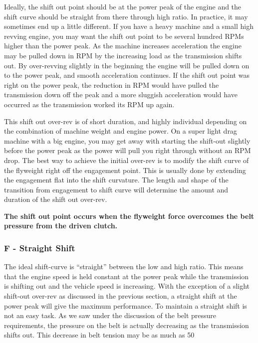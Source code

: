 \documentclass[12pt, titlepage]{article}
\begin{document}
Ideally, the shift out point should be at the power peak of the engine and the shift curve should be straight from there through high ratio. In practice, it may sometimes end up a little different. If you have a heavy machine and a small high revving engine, you may want the shift out point to be several hundred RPMs higher than the power peak. As the machine increases acceleration the engine may be pulled down in RPM by the increasing load as the transmission shifts out. By over-revving slightly in the beginning the engine will be pulled down on to the power peak, and smooth acceleration continues. If the shift out point was right on the power peak, the reduction in RPM would have pulled the transmission down off the peak and a more sluggish acceleration would have occurred as the transmission worked its RPM up again.

This shift out over-rev is of short duration, and highly individual depending on the combination of machine weight and engine power. On a super light drag machine with a big engine, you may get away with starting the shift-out slightly before the power peak as the power will pull you right through without an RPM drop. The best way to achieve the initial over-rev is to modify the shift curve of the flyweight right off the engagement point. This is usually done by extending the engagement flat into the shift curvature. The length and shape of the transition from engagement to shift curve will determine the amount and duration of the shift out over-rev.

\textbf{The shift out point occurs when the flyweight force overcomes the belt pressure from the driven clutch.}

\subsubsection*{F - Straight Shift}

The ideal shift-curve is “straight” between the low and high ratio. This means that the engine speed is held constant at the power peak while the transmission is shifting out and the vehicle speed is increasing. With the exception of a slight shift-out over-rev as discussed in the previous section, a straight shift at the power peak will give the maximum performance. To maintain a straight shift is not an easy task. As we saw under the discussion of the belt pressure requirements, the pressure on the belt is actually decreasing as the transmission shifts out. This decrease in belt tension may be as much as 50%
\end{document}
